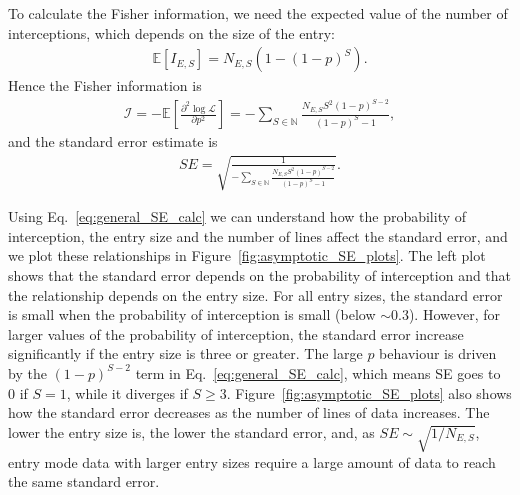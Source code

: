 \documentclass{article}
\begin{document}
To calculate the Fisher information, we need the expected value of the number of interceptions, which depends on the size of the entry:
\begin{align}
\mathbb{E}\left[I_{E,S}\right] = N_{E,S}(1-(1-p)^S). \label{eq:exp_intercept}
\end{align} 
Hence the Fisher information is
\begin{align}
\mathcal{I} = -\mathbb{E}\left[\frac{\partial^2 \log\mathcal{L}}{\partial p^2}\right]=
 -\sum_{S\in\mathbb{N}}\frac{N_{E,S}S^2(1-p)^{S-2}}{(1-p)^S-1}, \label{eq:fisher_information}
\end{align}
and the standard error estimate is
\begin{align}
SE = \sqrt{\frac{1}{-\sum_{S\in\mathbb{N}}\frac{N_{E,S}S^2(1-p)^{S-2}}{(1-p)^S-1}}}.\label{eq:general_SE_calc}
\end{align}


Using Eq.~\eqref{eq:general_SE_calc} we can understand how the probability of interception, the entry size and the number of lines affect the standard error, and we plot these relationships in Figure~\ref{fig:asymptotic_SE_plots}. The left plot shows that the standard error depends on the probability of interception and that the relationship depends on the entry size. For all entry sizes, the standard error is small when the probability of interception is small (below \(\sim 0.3\)). However, for larger values of the probability of interception, the standard error increase significantly if the entry size is three or greater. The large \(p\) behaviour is driven by the \((1-p)^{S-2}\) term in Eq.~\eqref{eq:general_SE_calc}, which means SE goes to 0 if \(S=1\), while it diverges if \(S\geq 3\). Figure~\ref{fig:asymptotic_SE_plots} also shows how the standard error decreases as the number of lines of data increases. The lower the entry size is, the lower the standard error, and, as \(SE\sim\sqrt{1/N_{E,S}}\), entry mode data with larger entry sizes require a large amount of data to reach the same standard error. 
\end{document}
